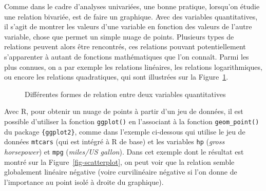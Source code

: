 \documentclass[
  letterpaper,
]{book}
\begin{document}
Comme dans le cadre d'analyses univariées, une bonne pratique, lorsqu'on
étudie une relation bivariée, est de faire un graphique. Avec des
variables quantitatives, il s'agit de montrer les valeurs d'une variable
en fonction des valeurs de l'autre variable, chose que permet un simple
nuage de points. Plusieurs types de relations peuvent alors être
rencontrés, ces relations pouvant potentiellement s'apparenter à autant
de fonctions mathématiques que l'on connaît. Parmi les plus connues, on
a par exemple les relations linéaires, les relations logarithmiques, ou
encore les relations quadratiques, qui sont illustrées sur la
Figure~\ref{fig-relationshipsIllustrations}.

\begin{figure}


\caption{\label{fig-relationshipsIllustrations}Différentes formes de
relation entre deux variables quantitatives}

\end{figure}%

Avec R, pour obtenir un nuage de points à partir d'un jeu de données, il
est possible d'utiliser la fonction \texttt{ggplot()} en l'associant à
la fonction \texttt{geom\_point()} du package \texttt{\{ggplot2\}},
comme dans l'exemple ci-dessous qui utilise le jeu de données
\texttt{mtcars} (qui est intégré à R de base) et les variables
\texttt{hp} (\emph{gross horsepower}) et \texttt{mpg} (\emph{miles/US
gallon}). Dans cet exemple dont le résultat est montré sur la
Figure~\ref{fig-scatterplot}, on peut voir que la relation semble
globalement linéaire négative (voire curvilinéaire négative si l'on
donne de l'importance au point isolé à droite du graphique).
\end{document}
